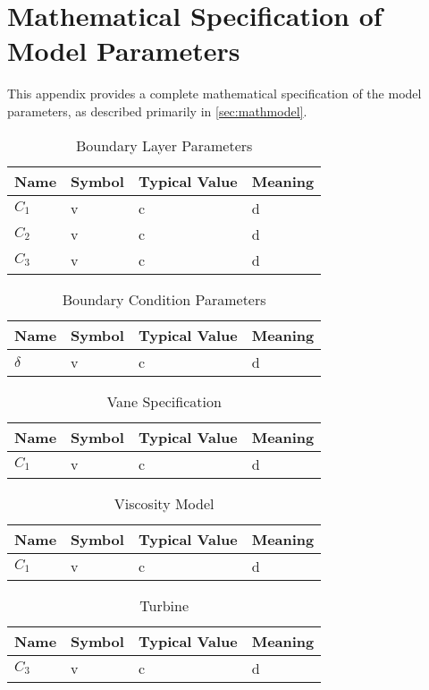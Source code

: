 \section{Mathematical Specification of Model Parameters}
\label{app:model_param}

This appendix provides a complete mathematical specification of the
model parameters, as described primarily in \ref{sec:mathmodel}.


%
%
%
\begin{table}[]
\centering
\caption{Boundary Layer Parameters}
\begin{tabular}{|l|l|l|l|}
\hline
Name & Symbol & Typical Value & Meaning \\
\hline
$C_1$     &   v     &      c         &    d     \\
$C_2$     &   v     &      c         &    d     \\
$C_3$     &   v     &      c         &    d     \\
\hline
\end{tabular}
\label{my-label}
\end{table}


%
%
%

\begin{table}[]
\centering
\caption{Boundary Condition Parameters}
\begin{tabular}{|l|l|l|l|}
\hline
Name & Symbol & Typical Value & Meaning \\
\hline
$\delta$     &   v     &      c         &    d     \\
\hline
\end{tabular}
\label{my-label}
\end{table}

%
%
%
\begin{table}[]
\centering
\caption{Vane Specification}
\begin{tabular}{|l|l|l|l|}
\hline
Name & Symbol & Typical Value & Meaning \\
\hline
$C_1$     &   v     &      c         &    d     \\
\hline
\end{tabular}
\label{my-label}
\end{table}

%
%
%
\begin{table}[]
\centering
\caption{Viscosity Model}
\begin{tabular}{|l|l|l|l|}
\hline
Name & Symbol & Typical Value & Meaning \\
\hline
$C_1$     &   v     &      c         &    d     \\
\hline
\end{tabular}
\label{my-label}
\end{table}


%
%
\begin{table}[]
\centering
\caption{Turbine}
\begin{tabular}{|l|l|l|l|}
\hline
Name & Symbol & Typical Value & Meaning \\
\hline
$C_3$     &   v     &      c         &    d     \\
\hline
\end{tabular}
\label{my-label}
\end{table}
